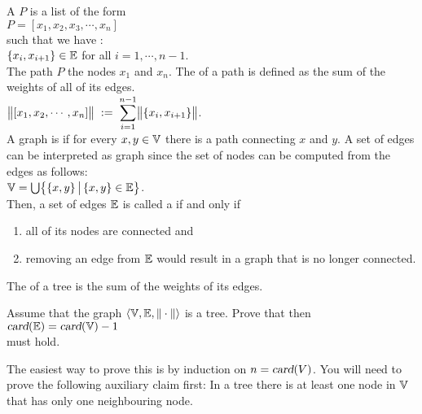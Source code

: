 \noindent
A  $P$ is a list of the form 
\\[0.2cm]
\hspace*{1.3cm} 
$P = [ x_1, x_2, x_3, \cdots, x_n ]$ 
\\[0.2cm]
such that we have : \\[0.2cm]
\hspace*{1.3cm}
 $\{x_i,x_{i+1}\} \in {\mathbb E}$  \quad for all $i = 1, \cdots, n-1$.
\\[0.2cm]
The path $P$  the nodes $x_1$ and $x_n$.  The  of a path is defined as
the sum of the weights of all of its edges.  
\\[0.2cm]
\hspace*{1.3cm}
 $\displaystyle\bigl\|[x_1,x_2, \cdots, x_n]\bigr\| \;:=\; \sum\limits_{i=1}^{n-1} \bigl\|\{x_i,x_{i+1}\}\bigr\|$. 
\\[0.2cm]
A graph is  if for every $x,y \in {\mathbb V}$ there is a path connecting $x$ and $y$.
A set of edges can be interpreted as graph since the set of nodes can be computed from the edges as
follows: 
\\[0.2cm]
\hspace*{1.3cm}
${\mathbb V} = \bigcup \bigl\{\{x,y\} \,\big|\, \{x,y\} \in {\mathbb E} \bigr\}$.
\\[0.2cm]
Then, a set of edges ${\mathbb E}$ is called a  if and only if
\begin{enumerate}
\item all of its nodes are connected \quad and
\item removing an edge from ${\mathbb E}$ would result in a graph that is no longer connected.
\end{enumerate}
The  of a tree is the sum of the weights of its edges.

\exercise
Assume that the graph $\langle {\mathbb V}, {\mathbb E}, \|\cdot\|\rangle$ is a tree.  Prove that then
\\[0.2cm]
\hspace*{1.3cm}
$\textsl{card}({\mathbb E}) = \textsl{card}({\mathbb V}) - 1$
\\[0.2cm]
must hold.  

\hint
The easiest way to prove this is by induction on $n = \textsl{card}(V)$.  You will need to prove the
following auxiliary claim first: In a tree there is at least one node in ${\mathbb V}$ that has
only one neighbouring node. 
\eox

